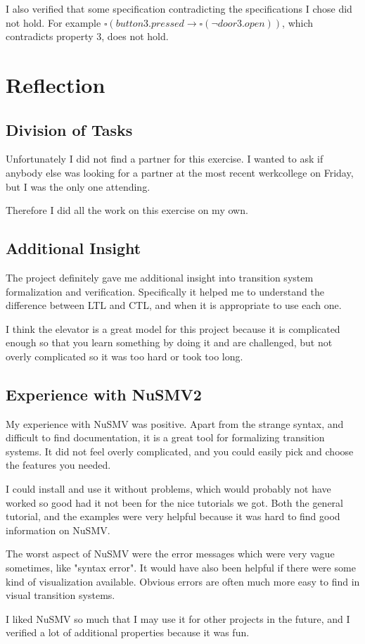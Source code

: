 \documentclass[12pt, a4paper]{article}
\begin{document}
I also verified that some specification contradicting the specifications I chose did not hold. For example $\square (button3.pressed \rightarrow \square (\lnot door3.open))$, which contradicts property 3, does not hold.

\section{Reflection}
\subsection{Division of Tasks}
Unfortunately I did not find a partner for this exercise. I wanted to ask if anybody else was looking for a partner at the most recent werkcollege on Friday, but I was the only one attending.

Therefore I did all the work on this exercise on my own.

\subsection{Additional Insight}
The project definitely gave me additional insight into transition system formalization and verification. Specifically it helped me to understand the difference between LTL and CTL, and when it is appropriate to use each one.

I think the elevator is a great model for this project because it is complicated enough so that you learn something by doing it and are challenged, but not overly complicated so it was too hard or took too long.

\subsection{Experience with NuSMV2}
My experience with NuSMV was positive. Apart from the strange syntax, and difficult to find documentation, it is a great tool for formalizing transition systems. It did not feel overly complicated, and you could easily pick and choose the features you needed.

I could install and use it without problems, which would probably not have worked so good had it not been for the nice tutorials we got. Both the general tutorial, and the examples were very helpful because it was hard to find good information on NuSMV.

The worst aspect of NuSMV were the error messages which were very vague sometimes, like "syntax error". It would have also been helpful if there were some kind of visualization available. Obvious errors are often much more easy to find in visual transition systems.

I liked NuSMV so much that I may use it for other projects in the future, and I verified a lot of additional properties because it was fun.
\end{document}
